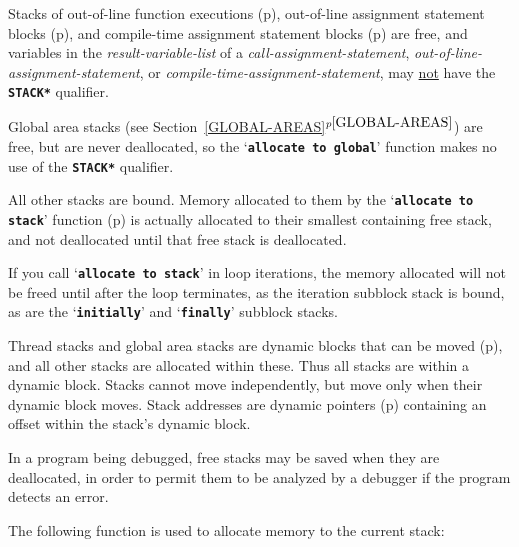 \documentclass[12pt]{article}
\newcommand{\TT}[1]{{\tt \bfseries #1}}
\newcommand{\itemref}[1]{\ref{#1}$^{p\pageref{#1}}$}
\newcommand{\pagref}[1]{p\pageref{#1}}
\begin{document}
Stacks of out-of-line function executions
(\pagref{OUT-OF-LINE-FUNCTIONS}),
out-of-line assignment statement blocks
(\pagref{OUT-OF-LINE-ASSIGNMENT-STATEMENTS}),
and
compile-time assignment statement blocks
(\pagref{COMPILE-TIME-ASSIGNMENT-STATEMENTS})
are free, and variables in the {\em result-variable-list}
of a {\em call-assignment-statement},
{\em out-of-line-assignment-statement}, or
{\em compile-time-assignment-statement},
may \underline{not} have the \TT{*STACK*} qualifier.

Global area stacks (see Section~\itemref{GLOBAL-AREAS}) are free,
but are never deallocated, so the
`\TT{allocate to global}' function makes no use of the \TT{*STACK*}
qualifier.

All other stacks are bound.  Memory allocated to them
by the `\TT{allocate to stack}' function (\pagref{ALLOCATE-TO-STACK})
is actually
allocated to their smallest containing free stack, and not deallocated
until that free stack is deallocated.

If you call `\TT{allocate to stack}' in loop iterations, the memory
allocated will not be freed until after the loop terminates, as the
iteration subblock stack is bound, as are the
`\TT{initially}' and `\TT{finally}' subblock stacks.

Thread stacks and global area stacks are dynamic blocks that can be moved
(\pagref{DYNAMIC-STACKS-AND-GLOBAL-AREAS}),
and all other stacks are allocated within these.  Thus all stacks are
within a dynamic block.  Stacks cannot move independently, but move
only when their dynamic block moves.  Stack addresses are dynamic
pointers (\pagref{DYNAMIC-POINTER})
containing an offset within the stack's dynamic block.

In a program being debugged, free stacks may be saved when they are
deallocated, in order to permit them to be analyzed
by a debugger if the program detects an error.

The following function is used to allocate memory to the
current stack:
\end{document}
